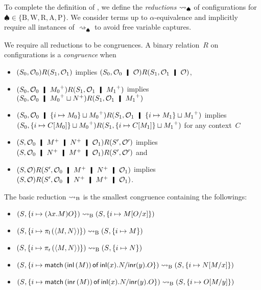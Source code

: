 To complete the definition of \lgd,
 we define the \textit{reductions} $\rightsquigarrow_\spadesuit$ of
 configurations for $\spadesuit\in\{\mathrm B, \mathrm W, \mathrm R, \mathrm A,
 \mathrm P\}$.
 We consider terms up to $\alpha$-equivalence and implicitly
 require all instances
 of $\rightsquigarrow_\spadesuit$ to avoid free variable captures.

We require all reductions to be congruences.
A binary relation~$R$ on configurations is a \textit{congruence}
when
\begin{itemize}
 \item $({S_0},{\mathcal{O}_0}) R ({S_1},{\mathcal{O}_1})$ implies
       $\concreteconf{S_0}{\hypert_0\hmid \hypert} R
       \concreteconf{S_1}{\hypert_1\hmid \hypert}$,
 \item $\concreteconf{S_0}{\hypert_0\hmid \m{M_0}} R
       \concreteconf{S_1}{\hypert_1 \hmid \m{M_1}}$ implies
       $\concreteconf{S_0}{\hypert_0\hmid \m{M_0}\sqcup \m{N}} R
       \concreteconf{S_1}{\hypert_1\hmid \m{M_1}}$
 \item $\concreteconf{S_0}{\hypert_0\hmid \{i\mapsto M_0\}\sqcup
       \m{M_0}} R \concreteconf{S_1}{\hypert_1\hmid \imapsto{M_1}\sqcup
       \m{M_1}}$ implies
       $({S_0},{\{i\mapsto {C[M_0]}\}\sqcup {M_0}^+}) R
       ({S_1},{\{i\mapsto {C[M_1]}\}\sqcup {M_1}^+})$ for any
       context~$C$
 \item $\concreteconf{S}{\hypert_0\hmid \m{M}\hmid \m{N} \hmid \hypert_1}
       R \concreteconf{S'}{\hypert'}$
       implies
       $\concreteconf{S}{\hypert_0\hmid \m{N}\hmid \m{M} \hmid \hypert_1}
       R \concreteconf{S'}{\hypert'}$ and
 \item $\concreteconf{S}{\hypert} R \concreteconf{S'}{\hypert_0\hmid
       \m{M}\hmid \m{N}\hmid \hypert_1}$
       implies
       $\concreteconf{S}{\hypert} R \concreteconf{S'}{\hypert_0\hmid
       \m{N}\hmid \m{M}\hmid \hypert_1}$.
\end{itemize}

\begin{definition}
 The basic reduction $\rightsquigarrow_{\mathrm B}$ is the smallest congruence containing
 the followings:
 \begin{itemize}
  \item  $({S}{},{\{i\mapsto {(\lambda x.M)O}\}})\rightsquigarrow_{\mathrm B}
	 ({S}{},{\{i\mapsto {M[O/x]}\}})$
  \item $({S}{},{\{i\mapsto {\pi_{\mathsf l}\left({\langle{M,N}\rangle}\right)}\}}) \rightsquigarrow_{\mathrm B}
	 ({S}{},{           \{i\mapsto {M}\}   })$
  \item $({S}{},{\{i\mapsto {\pi_{\mathsf r}\left({\langle{M,N}\rangle}\right)}\}}) \rightsquigarrow_{\mathrm B}
	 ({S}{},{             \{i\mapsto {N}\} })$
  \item $({S}{},{\{i\mapsto {\mathsf{match}\,{(\mathsf{inl}\left({M}\right))}\,\mathsf{of}\, \mathsf{inl}({x}). {N}/ \mathsf{inr}({y}). {O}}\}}) \rightsquigarrow_{\mathrm B}
	 ({S}{},{              \{i\mapsto {N[M/x]}\}})$
  \item $({S}{},{\{i\mapsto {\mathsf{match}\,{(\mathsf{inr}\left({M}\right))}\,\mathsf{of}\, \mathsf{inl}({x}). {N}/ \mathsf{inr}({y}). {O}}\}}) \rightsquigarrow_{\mathrm B}
	 ({S}{},{                  \{i\mapsto {O[M/y]}\}})$
 \end{itemize}
\end{definition}


